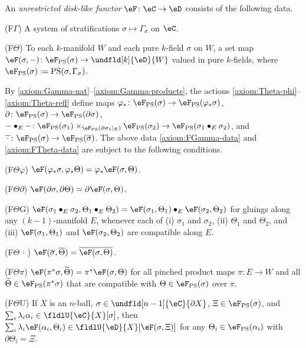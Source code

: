 \documentclass[12pt,reqno]{amsart}
\newcounter{alpha}\renewcommand\thealpha{\upshape\Alph{alpha}}
\newcommand{\C}{\eC}
\newcommand{\D}{\eD}
\newcommand{\blt}{\bullet}
\newcommand{\fcj}[1]{\overline{#1}}
\newcommand{\orev}{\overline}
\newcommand{\defn}[1]{\emph{#1}}
\DeclareRobustCommand{\coloneq}{\mathrel{\vcenter{\baselineskip0.5ex\lineskiplimit0pt\hbox{\scriptsize{\upshape.}}\hbox{\scriptsize{\upshape.}}}}=}
\begin{document}
\begin{definition}
\label{def:unrestricted-functor}
An \defn{unrestricted disk-like functor} $\eF\colon\C\to\D$ consists of the following data.
\begin{lst}
  \item[(F$\Gamma$)]\label{axiom:FGamma-data} A system of stratifications $\sigma\mapsto\Gamma_\sigma$ on $\C$.
  \item[(F$\Theta$)]\label{axiom:FTheta-data} To each $k$-manifold $W$ and each pure $k$-field $\sigma$ on $W$, a set map $\eF(\sigma,-)\colon\eF_{\mathrm{PS}}(\sigma)\to\undfld[k]{\D}{W}$ valued in pure $k$-fields, where $\eF_{\mathrm{PS}}(\sigma)\coloneq\mathrm{PS}(\sigma,\Gamma_\sigma)$.
\end{lst}
By \ref{axiom:Gamma-nat}--\ref{axiom:Gamma-products}, the actions \ref{axiom:Theta-phi}--\ref{axiom:Theta-refl} define maps $\varphi_*\colon\eF_{\mathrm{PS}}(\sigma)\to\eF_{\mathrm{PS}}(\varphi_*\sigma)$, $\partial\colon\eF_{\mathrm{PS}}(\sigma)\to\eF_{\mathrm{PS}}(\partial\sigma)$, $-\blt_E-\colon\eF_{\mathrm{PS}}(\sigma_1)\times_{\eF_{\mathrm{PS}}(\partial\sigma_1|_E)}\eF_{\mathrm{PS}}(\sigma_2)\to\eF_{\mathrm{PS}}(\sigma_1\blt_E\sigma_2)$, and $\orev{\,\cdot\,}\colon\eF_{\mathrm{PS}}(\sigma)\to\eF_{\mathrm{PS}}(\fcj\sigma)$. The above data \ref{axiom:FGamma-data} and \ref{axiom:FTheta-data} are subject to the following conditions. 
\begin{lst}
  \item[(F$\Theta\varphi$)]\label{axiom:FTheta-nat} $\eF(\varphi_*\sigma,\varphi_*\Theta)=\varphi_*\eF(\sigma,\Theta)$.
  \item[(F$\Theta\partial$)]\label{axiom:FTheta-bdy} $\eF(\partial\sigma,\partial\Theta)=\partial\eF(\sigma,\Theta)$.
  \item[(F$\Theta$G)]\label{axiom:FTheta-gluing} $\eF(\sigma_1\blt_E\sigma_2,\Theta_1\blt_E\Theta_2)=\eF(\sigma_1,\Theta_1)\blt_E\eF(\sigma_2,\Theta_2)$ for gluings along any $(k-1)$-manifold $E$, whenever each of (i) $\sigma_1$ and $\sigma_2$, (ii) $\Theta_1$ and $\Theta_2$, and (iii) $\eF(\sigma_1,\Theta_1)$ and $\eF(\sigma_2,\Theta_2)$ are compatible along $E$.
  \item[(F$\Theta\orev{\,\cdot\,}$)]\label{axiom:FTheta-refl} $\eF(\fcj\sigma,\orev\Theta)=\fcj{\eF(\sigma,\Theta)}$.
  \item[(F$\Theta\pi$)]\label{axiom:FTheta-products} $\eF(\pi^*\sigma,\widetilde\Theta)=\pi^*\eF(\sigma,\Theta)$ for all pinched product maps $\pi\colon E\to W$ and all $\widetilde\Theta\in\eF_{\mathrm{PS}}(\pi^*\sigma)$ that are compatible with $\Theta\in\eF_{\mathrm{PS}}(\sigma)$ over $\pi$.
  
  \item[(F$\Theta$U)]\label{axiom:FTheta-local-relations} If $X$ is an $n$-ball, $\sigma\in\undfld[n-1]{\C}{\partial X}$, $\Xi\in\eF_{\mathrm{PS}}(\sigma)$, and $\sum_i\lambda_i\alpha_i\in\fldlU{\C}{X}[\sigma]$, then $\sum_i\lambda_i\eF(\alpha_i,\Theta_i)\in\fldlU{\D}{X}[\eF(\sigma,\Xi)]$ for any $\Theta_i\in\eF_{\mathrm{PS}}(\alpha_i)$ with $\partial\Theta_i=\Xi$.
\end{lst}
\end{definition}
\end{document}

